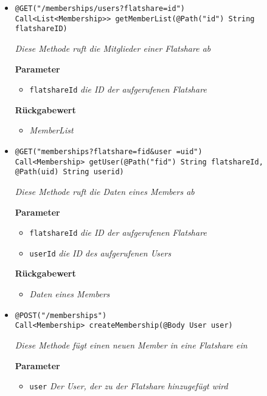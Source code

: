 		\begin{itemize}
		\item\texttt{{@GET("/memberships/users?flatshare={id}") \\ Call<List<Membership>> getMemberList(@Path("id") String flatshareID)}}

		\textit{Diese Methode ruft die Mitglieder einer Flatshare ab}

		\textbf{Parameter} 
			\begin{itemize}
				\item\texttt{flatshareId}
		 		\textit{die ID der aufgerufenen Flatshare}
	 		\end{itemize}

		\textbf{Rückgabewert} 
		\begin{itemize}
		\item\textit{MemberList}
		\end{itemize}


      \item\texttt{{@GET("memberships?flatshare={fid}\&user ={uid}")\\Call<Membership> getUser(@Path("fid") String flatshareId, @Path(\grqq uid\grqq) String userid)}}

		\textit{Diese Methode ruft die Daten eines Members ab}        	

		\textbf{Parameter} 
			\begin{itemize}
				\item\texttt{flatshareId}
		 		\textit{die ID der aufgerufenen Flatshare}
		 		\item\texttt{userId}
		 		\textit{die ID des aufgerufenen Users}
	 		\end{itemize}

		\textbf{Rückgabewert} 
		\begin{itemize}
		\item\textit{Daten eines Members}
		\end{itemize}


      \item\texttt{{@POST("/memberships")\\ Call<Membership> createMembership(@Body User user)}}

		\textit{Diese Methode fügt einen neuen Member in eine Flatshare ein}        	
		
		\textbf{Parameter} 
			\begin{itemize}
				\item\texttt{user}
		 		\textit{ Der User, der zu der Flatshare hinzugefügt wird}
	 		\end{itemize}


\end{itemize}
